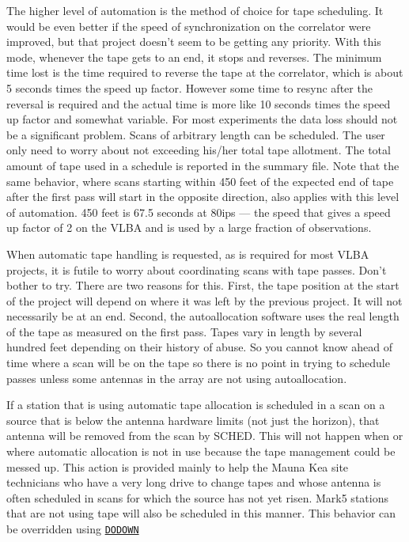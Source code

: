 \documentclass{report}
\newcommand{\sched}{{\sc SCHED}}
\begin{document}
The higher level of automation is the method of choice for tape
scheduling.  It would be even better if the speed of synchronization
on the correlator were improved, but that project doesn't seem to be
getting any priority.  With this mode, whenever the tape gets to an
end, it stops and reverses.  The minimum time lost is the time
required to reverse the tape at the correlator, which is about 5
seconds times the speed up factor.  However some time to resync after
the reversal is required and the actual time is more like 10 seconds
times the speed up factor and somewhat variable.  For most experiments
the data loss should not be a significant problem.  Scans of arbitrary
length can be scheduled.  The user only need to worry about not
exceeding his/her total tape allotment.  The total amount of tape used
in a schedule is reported in the summary file.  Note that the same
behavior, where scans starting within 450 feet of the expected end of
tape after the first pass will start in the opposite direction, also
applies with this level of automation.  450 feet is 67.5 seconds at
80ips --- the speed that gives a speed up factor of 2 on the VLBA and
is used by a large fraction of observations.

When automatic tape handling is requested, as is required for most
VLBA projects, it is futile to worry about coordinating scans with
tape passes.  Don't bother to try.  There are two reasons for this.
First, the tape position at the start of the project will depend on
where it was left by the previous project.  It will not necessarily be
at an end.  Second, the autoallocation software uses the real length
of the tape as measured on the first pass.  Tapes vary in length by
several hundred feet depending on their history of abuse.  So you
cannot know ahead of time where a scan will be on the tape so there
is no point in trying to schedule passes unless some antennas in the
array are not using autoallocation.

If a station that is using automatic tape allocation is scheduled in a
scan on a source that is below the antenna hardware limits (not just
the horizon), that antenna will be removed from the scan by \sched.
This will not happen when or where automatic allocation is not in
use because the tape management could be messed up.  This action is
provided mainly to help the Mauna Kea site technicians who have a
very long drive to change tapes and whose antenna is often scheduled
in scans for which the source has not yet risen.  Mark5 stations
that are not using tape will also be scheduled in this manner.  This
behavior can be overridden using 
{\hyperref[MP:DODOWN]{{\tt DODOWN}}}
\end{document}
